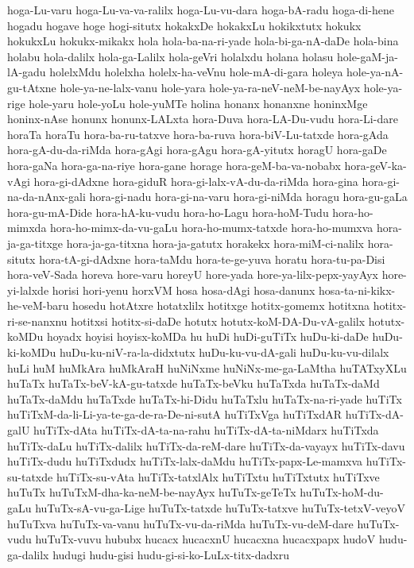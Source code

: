 {hoga-Lu-varu
hoga-Lu-va-va-ralilx
hoga-Lu-vu-dara
hoga-bA-radu
hoga-di-hene
hogadu
hogave
hoge
hogi-situtx
hokakxDe
hokakxLu
hokikxtutx
hokukx
hokukxLu
hokukx-mikakx
hola
hola-ba-na-ri-yade
hola-bi-ga-nA-daDe
hola-bina
holabu
hola-dalilx
hola-ga-Lalilx
hola-geVri
holalxdu
holana
holasu
hole-gaM-ja-lA-gadu
holelxMdu
holelxha
holelx-ha-veVnu
hole-mA-di-gara
holeya
hole-ya-nA-gu-tAtxne
hole-ya-ne-lalx-vanu
hole-yara
hole-ya-ra-neV-neM-be-nayAyx
hole-ya-rige
hole-yaru
hole-yoLu
hole-yuMTe
holina
honanx
honanxne
honinxMge
honinx-nAse
honunx
honunx-LALxta
hora-Duva
hora-LA-Du-vudu
hora-Li-dare
horaTa
horaTu
hora-ba-ru-tatxve
hora-ba-ruva
hora-biV-Lu-tatxde
hora-gAda
hora-gA-du-da-riMda
hora-gAgi
hora-gAgu
hora-gA-yitutx
horagU
hora-gaDe
hora-gaNa
hora-ga-na-riye
hora-gane
horage
hora-geM-ba-va-nobabx
hora-geV-ka-vAgi
hora-gi-dAdxne
hora-giduR
hora-gi-lalx-vA-du-da-riMda
hora-gina
hora-gi-na-da-nAnx-gali
hora-gi-nadu
hora-gi-na-varu
hora-gi-niMda
horagu
hora-gu-gaLa
hora-gu-mA-Dide
hora-hA-ku-vudu
hora-ho-Lagu
hora-hoM-Tudu
hora-ho-mimxda
hora-ho-mimx-da-vu-gaLu
hora-ho-mumx-tatxde
hora-ho-mumxva
hora-ja-ga-titxge
hora-ja-ga-titxna
hora-ja-gatutx
horakekx
hora-miM-ci-nalilx
hora-situtx
hora-tA-gi-dAdxne
hora-taMdu
hora-te-ge-yuva
horatu
hora-tu-pa-Disi
hora-veV-Sada
horeva
hore-varu
horeyU
hore-yada
hore-ya-lilx-pepx-yayAyx
hore-yi-lalxde
horisi
hori-yenu
horxVM
hosa
hosa-dAgi
hosa-danunx
hosa-ta-ni-kikx-he-veM-baru
hosedu
hotAtxre
hotatxlilx
hotitxge
hotitx-gomemx
hotitxna
hotitx-ri-se-nanxnu
hotitxsi
hotitx-si-daDe
hotutx
hotutx-koM-DA-Du-vA-galilx
hotutx-koMDu
hoyadx
hoyisi
hoyisx-koMDa
hu
huDi
huDi-guTiTx
huDu-ki-daDe
huDu-ki-koMDu
huDu-ku-niV-ra-la-didxtutx
huDu-ku-vu-dA-gali
huDu-ku-vu-dilalx
huLi
huM
huMkAra
huMkAraH
huNiNxme
huNiNx-me-ga-LaMtha
huTATxyXLu
huTaTx
huTaTx-beV-kA-gu-tatxde
huTaTx-beVku
huTaTxda
huTaTx-daMd
huTaTx-daMdu
huTaTxde
huTaTx-hi-Didu
huTaTxlu
huTaTx-na-ri-yade
huTiTx
huTiTxM-da-li-Li-ya-te-ga-de-ra-De-ni-sutA
huTiTxVga
huTiTxdAR
huTiTx-dA-galU
huTiTx-dAta
huTiTx-dA-ta-na-rahu
huTiTx-dA-ta-niMdarx
huTiTxda
huTiTx-daLu
huTiTx-dalilx
huTiTx-da-reM-dare
huTiTx-da-vayayx
huTiTx-davu
huTiTx-dudu
huTiTxdudx
huTiTx-lalx-daMdu
huTiTx-papx-Le-mamxva
huTiTx-su-tatxde
huTiTx-su-vAta
huTiTx-tatxlAlx
huTiTxtu
huTiTxtutx
huTiTxve
huTuTx
huTuTxM-dha-ka-neM-be-nayAyx
huTuTx-geTeTx
huTuTx-hoM-du-gaLu
huTuTx-sA-vu-ga-Lige
huTuTx-tatxde
huTuTx-tatxve
huTuTx-tetxV-veyoV
huTuTxva
huTuTx-va-vanu
huTuTx-vu-da-riMda
huTuTx-vu-deM-dare
huTuTx-vudu
huTuTx-vuvu
hububx
hucacx
hucacxnU
hucacxna
hucacxpapx
hudoV
hudu-ga-dalilx
hudugi
hudu-gisi
hudu-gi-si-ko-LuLx-titx-dadxru
}
